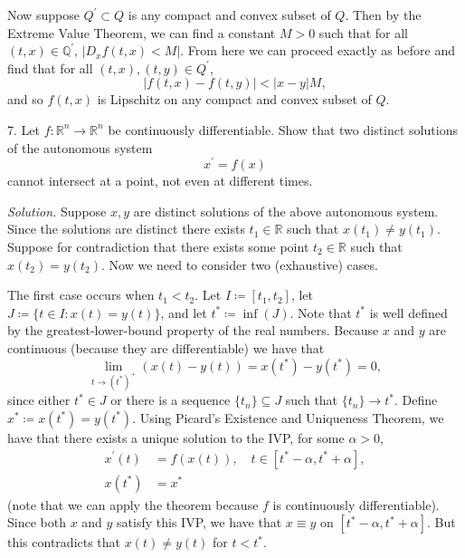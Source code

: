 \documentclass{article}
\newcommand{\Q}{\mathbb{Q}}
\newcommand{\R}{\mathbb{R}}
\begin{document}
Now suppose $Q^\prime \subset Q$ is any compact and convex subset of $Q$. Then
by the Extreme Value Theorem, we can find a constant $M > 0$ such that for all
$(t, x) \in \Q^\prime$, $|D_x f(t, x) < M|$. From here we can proceed exactly as
before and find that for all $(t, x), (t, y) \in Q^\prime$,
%
\begin{equation*}
    |f(t, x) - f(t, y)| < |x - y| M
    ,
\end{equation*}
%
and so $f(t, x)$ is Lipschitz on any compact and convex subset of $Q$.


\newpage

7. Let $f: \R^n \to \R^n$ be continuously differentiable. Show that two distinct solutions
of the autonomous system
%
\begin{equation*}
    x^\prime = f(x)
\end{equation*}
%
cannot intersect at a point, not even at different times.

\textit{Solution.}
Suppose $x, y$ are distinct solutions of the above autonomous system.
Since the solutions are distinct there exists $t_1 \in \R$ such that $x(t_1) \neq y(t_1)$.
Suppose for contradiction that there exists some point $t_2 \in \R$ such that $x(t_2) = y(t_2)$.
Now we need to consider two (exhaustive) cases.

The first case occurs when $t_1 < t_2$. Let $I \coloneqq [t_1, t_2]$, let
$J \coloneqq \{t \in I: x(t) = y(t)\}$, and let $t^* \coloneqq \inf(J)$.
Note that $t^*$ is well defined by the greatest-lower-bound property of the real numbers.
Because $x$ and $y$ are continuous (because they are differentiable) we have that
%
\begin{equation*}
    \lim_{t \to (t^*)^+} (x(t) - y(t)) = x(t^*) - y(t^*) = 0
    ,
\end{equation*}
%
since either $t^* \in J$ or there is a sequence $\{t_n\} \subseteq J$ such that $\{t_n\} \to t^*$.
Define $x^* \coloneqq x(t^*) = y(t^*)$. Using Picard's Existence and Uniqueness Theorem, we have
that there exists a unique solution to the IVP, for some $\alpha > 0$,
%
\begin{align*}
    x^\prime(t) &= f(x(t)), \quad t \in [t^* - \alpha, t^* + \alpha], \\
    x(t^*) &= x^*
\end{align*}
%
(note that we can apply the theorem because $f$ is continuously differentiable). Since both
$x$ and $y$ satisfy this IVP, we have that $x \equiv y$ on $[t^* - \alpha, t^* + \alpha]$.
But this contradicts that $x(t) \neq y(t)$ for $t < t^*$.
\end{document}
